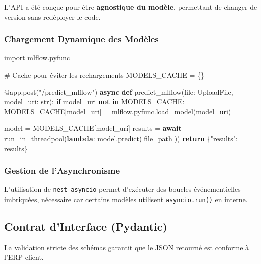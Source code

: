 \documentclass[
  letterpaper,
  DIV=11,
  numbers=noendperiod]{scrartcl}
\newenvironment{Shaded}{\begin{snugshade}}{\end{snugshade}}
\newcommand{\AttributeTok}[1]{\textcolor[rgb]{0.40,0.45,0.13}{#1}}
\newcommand{\BuiltInTok}[1]{\textcolor[rgb]{0.00,0.23,0.31}{#1}}
\newcommand{\CommentTok}[1]{\textcolor[rgb]{0.37,0.37,0.37}{#1}}
\newcommand{\ControlFlowTok}[1]{\textcolor[rgb]{0.00,0.23,0.31}{\textbf{#1}}}
\newcommand{\ImportTok}[1]{\textcolor[rgb]{0.00,0.46,0.62}{#1}}
\newcommand{\KeywordTok}[1]{\textcolor[rgb]{0.00,0.23,0.31}{\textbf{#1}}}
\newcommand{\NormalTok}[1]{\textcolor[rgb]{0.00,0.23,0.31}{#1}}
\newcommand{\OperatorTok}[1]{\textcolor[rgb]{0.37,0.37,0.37}{#1}}
\newcommand{\StringTok}[1]{\textcolor[rgb]{0.13,0.47,0.30}{#1}}
\begin{document}
L'API a été conçue pour être \textbf{agnostique du modèle}, permettant
de changer de version sans redéployer le code.

\subsubsection{Chargement Dynamique des
Modèles}\label{chargement-dynamique-des-moduxe8les}

\begin{Shaded}
\begin{Highlighting}[]
\ImportTok{import}\NormalTok{ mlflow.pyfunc}

\CommentTok{\# Cache pour éviter les rechargements}
\NormalTok{MODELS\_CACHE }\OperatorTok{=}\NormalTok{ \{\}}

\AttributeTok{@app.post}\NormalTok{(}\StringTok{"/predict\_mlflow"}\NormalTok{)}
\ControlFlowTok{async} \KeywordTok{def}\NormalTok{ predict\_mlflow(}\BuiltInTok{file}\NormalTok{: UploadFile, model\_uri: }\BuiltInTok{str}\NormalTok{):}
    \ControlFlowTok{if}\NormalTok{ model\_uri }\KeywordTok{not} \KeywordTok{in}\NormalTok{ MODELS\_CACHE:}
\NormalTok{        MODELS\_CACHE[model\_uri] }\OperatorTok{=}\NormalTok{ mlflow.pyfunc.load\_model(model\_uri)}
    
\NormalTok{    model }\OperatorTok{=}\NormalTok{ MODELS\_CACHE[model\_uri]}
\NormalTok{    results }\OperatorTok{=} \ControlFlowTok{await}\NormalTok{ run\_in\_threadpool(}\KeywordTok{lambda}\NormalTok{: model.predict([file\_path]))}
    \ControlFlowTok{return}\NormalTok{ \{}\StringTok{"results"}\NormalTok{: results\}}
\end{Highlighting}
\end{Shaded}

\subsubsection{Gestion de
l'Asynchronisme}\label{gestion-de-lasynchronisme}

L'utilisation de \texttt{nest\_asyncio} permet d'exécuter des boucles
événementielles imbriquées, nécessaire car certains modèles utilisent
\texttt{asyncio.run()} en interne.

\subsection{Contrat d'Interface
(Pydantic)}\label{contrat-dinterface-pydantic}

La validation stricte des schémas garantit que le JSON retourné est
conforme à l'ERP client.
\end{document}
